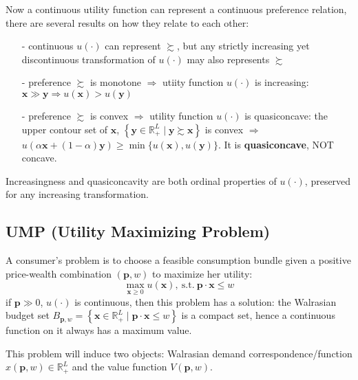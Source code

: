 Now a continuous utility function can represent a continuous preference relation, there are several results on how they relate to each other:
\begin{enumerate}
    \item[-] continuous $u(\cdot)$ can represent $\succsim$, but any strictly increasing yet discontinuous transformation of $u(\cdot)$ may also represents $\succsim$
    \item[-] preference $\succsim$ is monotone $\Rightarrow$ utiity function $u(\cdot)$ is increasing: $\mathbf{x}\gg \mathbf{y}\Rightarrow u(\mathbf{x})>u(\mathbf{y})$ 
    \item[-] preference $\succsim$ is convex $\Rightarrow$ utility function $u(\cdot)$ is quasiconcave: the upper contour set of $\mathbf{x}$, 
    $\left\{\mathbf{y}\in\mathbb{R}^L_+\mid \mathbf{y}\succsim \mathbf{x} \right\}$ is convex $\Rightarrow$ $u(\alpha\mathbf{x}+(1-\alpha)\mathbf{y})\geq \min\{u(\mathbf{x}),u(\mathbf{y})\}$. 
    It is \textbf{quasiconcave}, NOT concave.
\end{enumerate}
Increasingness and quasiconcavity are both ordinal properties of $u(\cdot)$, preserved for any increasing transformation.

\subsection{UMP (Utility Maximizing Problem)}
A consumer's problem is to choose a feasible consumption bundle given a positive price-wealth combination $(\mathbf{p},w)$ to maximize her utility:
$$\max_{\mathbf{x}\geq 0} u(\mathbf{x}),\ \text{s.t.}\ \mathbf{p}\cdot\mathbf{x}\leq w$$
if $\mathbf{p}\gg 0$, $u(\cdot)$ is continuous, then this problem has a solution: the Walrasian budget set $B_{\mathbf{p},w}=\left\{\mathbf{x}\in\mathbb{R}^L_+\mid \mathbf{p}\cdot\mathbf{x}\leq w\right\}$ is a compact set, hence a continuous function on it always has a maximum value.

This problem will induce two objects: Walrasian demand correspondence/function $ x(\mathbf{p},w)\in \mathbb{R}^L_+$ and the value function $V(\mathbf{p},w)$.

